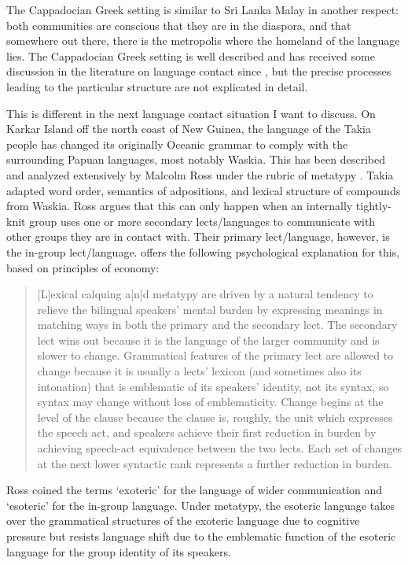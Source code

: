 \documentclass[a4paper,10pt]{article}
\begin{document}
The Cappadocian Greek setting is similar to Sri Lanka Malay in another respect: both communities are conscious that they are in the diaspora, and that somewhere out there, there is the metropolis where the homeland of the language lies. The Cappadocian Greek setting is well described and has received some discussion in the literature on language contact since \citet{ThomasonEtAl1988}, but the precise processes leading to the particular structure are not explicated in detail.

This is different in the next language contact situation I want to discuss. On Karkar Island off the north coast of New Guinea, the language of the Takia people  has changed its originally Oceanic grammar to comply with the surrounding Papuan languages, most notably Waskia. This has been described and analyzed extensively by Malcolm Ross under the rubric of metatypy \citep{Ross1996,Ross1997,Ross2001,Ross2007}. Takia adapted word order, semantics of adpositions, and lexical structure of compounds from Waskia. Ross argues that this can only happen when an internally tightly-knit group uses one or more secondary lects/languages to communicate with other groups they are in contact with. Their primary lect/language, however, is the in-group lect/language. \citet[189]{Ross2003diagnosing} offers the following psychological explanation for this, based on principles of economy:

\begin{quote}

[L]exical calquing a[n]d metatypy are driven by a natural tendency to relieve the bilingual speakers' mental burden by expressing meanings in matching ways in both the primary and the secondary lect. The secondary lect wins out because it is the language of the larger community and is slower to change. Grammatical features of the primary lect are allowed to change because it is usually a lects' lexicon (and sometimes also its intonation) that is emblematic of its speakers' identity, not its syntax, so syntax may change without loss of emblematicity. Change begins at the level of the clause because the clause is, roughly, the unit which expresses the speech act, and speakers achieve their first reduction in burden by achieving speech-act equivalence between the two lects. Each set of changes at the next lower syntactic rank represents a further reduction in burden.

\end{quote}

Ross coined the terms `exoteric' for the language of wider communication and `esoteric' for the in-group language. Under metatypy, the esoteric language takes over the grammatical structures of the exoteric language due to cognitive pressure but resists language shift due to the emblematic function of the esoteric language for the group identity of its speakers. 
\end{document}
